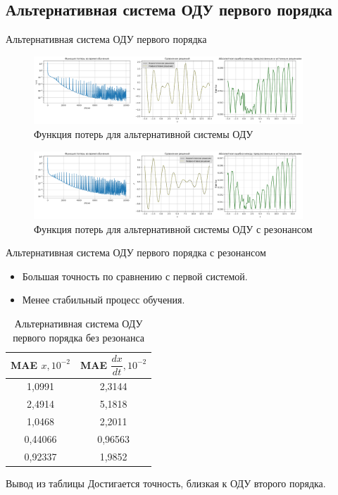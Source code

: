\documentclass{beamer}
\begin{document}
\subsection{Альтернативная система ОДУ первого порядка}
\begin{frame}{Альтернативная система ОДУ первого порядка}
    \begin{figure}[h!]
        \centering
        \includegraphics[width=0.9\textwidth]{images/Loss&x_alt_ODE.png}
        \caption{Функция потерь для альтернативной системы ОДУ}
        \label{fig:loss_alt}
    \end{figure}
    \begin{figure}[h!]
        \centering
        \includegraphics[width=0.9\textwidth]{images/Loss&x_alt_ODE_resonance.png}
        \caption{Функция потерь для альтернативной системы ОДУ с резонансом}
        \label{fig:loss_alt_resonance}
    \end{figure}
\end{frame}

\begin{frame}{Альтернативная система ОДУ первого порядка с резонансом}
    \begin{itemize}
        \item Большая точность по сравнению с первой системой.
        \item Менее стабильный процесс обучения.
    \end{itemize}
    
    \begin{table}[h!]
        \centering
        \begin{tabular}{|c|c|}
        \hline
        \textbf{MAE $x, 10^{-2}$} & \textbf{MAE $\dfrac{dx}{dt}, 10^{-2}$} \\
        \hline
        1,0991 & 2,3144 \\
        2,4914 & 5,1818 \\
        1,0468 & 2,2011 \\
        0,44066 & 0,96563 \\
        0,92337 & 1,9852 \\
        \hline
        \end{tabular}
        \caption{Альтернативная система ОДУ первого порядка без резонанса}
    \end{table}
    \vspace{0.5cm}
    \begin{block}{Вывод из таблицы}
        Достигается точность, близкая к ОДУ второго порядка.
    \end{block}
\end{frame}
\end{document}
